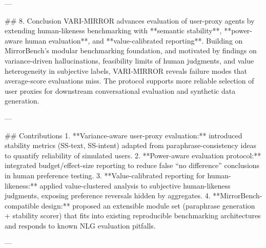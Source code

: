 ---

## 8. Conclusion  
VARI-MIRROR advances evaluation of user-proxy agents by extending human-likeness benchmarking with **semantic stability**, **power-aware human evaluation**, and **value-calibrated reporting**. Building on MirrorBench’s modular benchmarking foundation, and motivated by findings on variance-driven hallucinations, feasibility limits of human judgments, and value heterogeneity in subjective labels, VARI-MIRROR reveals failure modes that average-score evaluations miss. The protocol supports more reliable selection of user proxies for downstream conversational evaluation and synthetic data generation.

---

## Contributions  
1. **Variance-aware user-proxy evaluation:** introduced stability metrics (SS-text, SS-intent) adapted from paraphrase-consistency ideas to quantify reliability of simulated users.  
2. **Power-aware evaluation protocol:** integrated budget/effect-size reporting to reduce false “no difference” conclusions in human preference testing.  
3. **Value-calibrated reporting for human-likeness:** applied value-clustered analysis to subjective human-likeness judgments, exposing preference reversals hidden by aggregates.  
4. **MirrorBench-compatible design:** proposed an extensible module set (paraphrase generation + stability scorer) that fits into existing reproducible benchmarking architectures and responds to known NLG evaluation pitfalls.

---